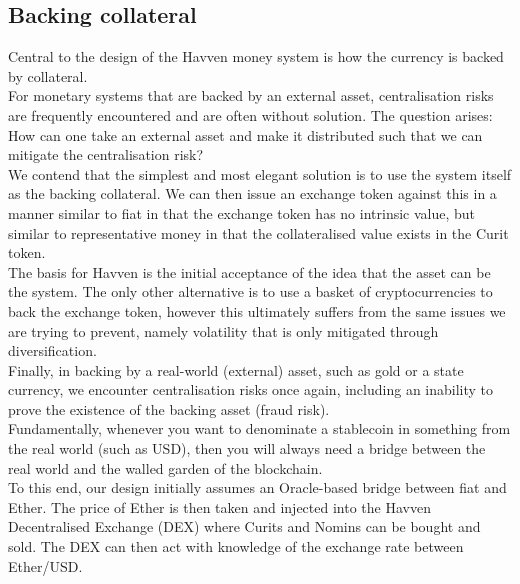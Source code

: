 \subsection{Backing collateral}

\noindent Central to the design of the Havven money system is how the currency is backed by collateral. \\

\noindent For monetary systems that are backed by an external asset, centralisation risks are frequently encountered and are often without solution. The question arises: \\

\noindent How can one take an external asset and make it distributed such that we can mitigate the centralisation risk? \\

\noindent We contend that the simplest and most elegant solution is to use the system itself as the backing collateral. We can then issue an exchange token against this in a manner similar to fiat in that the exchange token has no intrinsic value, but similar to representative money in that the collateralised value exists in the Curit token. \\

\noindent The basis for Havven is the initial acceptance of the idea that the asset can be the system. The only other alternative is to use a basket of cryptocurrencies to back the exchange token, however this ultimately suffers from the same issues we are trying to prevent, namely volatility that is only mitigated through diversification. \\

\noindent Finally, in backing by a real-world (external) asset, such as gold or a state currency, we encounter centralisation risks once again, including an inability to prove the existence of the backing asset (fraud risk). \\

\noindent Fundamentally, whenever you want to denominate a stablecoin in something from the real world (such as USD), then you will always need a bridge between the real world and the walled garden of the blockchain. \\

\noindent To this end, our design initially assumes an Oracle-based bridge between fiat and Ether. The price of Ether is then taken and injected into the Havven Decentralised Exchange (DEX) where Curits and Nomins can be bought and sold. The DEX can then act with knowledge of the exchange rate between Ether/USD. \\

